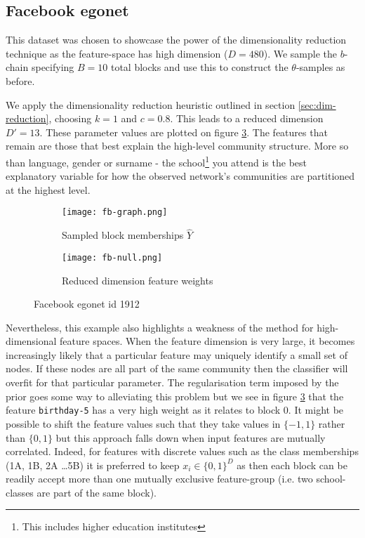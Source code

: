 \subsection{Facebook egonet}

This dataset was chosen to showcase the power of the dimensionality reduction technique as the feature-space has high dimension ($D=480$). We sample the $b$-chain specifying $B=10$ total blocks and use this to construct the $\theta$-samples as before. 

We apply the dimensionality reduction heuristic outlined in section \ref{sec:dim-reduction}, choosing $k=1$ and $c=0.8$. This leads to a reduced dimension $D'=13$. These parameter values are plotted on figure \ref{fig:fb-null}. The features that remain are those that best explain the high-level community structure. More so than language, gender or surname - the school\footnote{This includes higher education institutes} you attend is the best explanatory variable for how the observed network's communities are partitioned at the highest level. 
%
\begin{figure}[!h]
	\centering
	\begin{subfigure}{0.45\linewidth}
		\centering
		\texttt{[image: fb-graph.png]}
		\caption{Sampled block memberships $\hat{Y}$}
		\label{fig:fb-graph}
	\end{subfigure}
	\hfill
	\begin{subfigure}{0.45\linewidth}
		\centering
		\texttt{[image: fb-null.png]}
		\caption{Reduced dimension feature weights}
		\label{fig:fb-null}
	\end{subfigure}
	\caption{Facebook egonet id 1912 \cite{fb-snap}}
\end{figure}

Nevertheless, this example also highlights a weakness of the method for high-dimensional feature spaces. When the feature dimension is very large, it becomes increasingly likely that a particular feature may uniquely identify a small set of nodes. If these nodes are all part of the same community then the classifier will overfit for that particular parameter. The regularisation term imposed by the prior goes some way to alleviating this problem but we see in figure \ref{fig:fb-null} that the feature \verb*|birthday-5| has a very high weight as it relates to block 0. It might be possible to shift the feature values such that they take values in $\{-1, 1\}$ rather than $\{0, 1\}$ but this approach falls down when input features are mutually correlated. Indeed, for features with discrete values such as the class memberships (1A, 1B, 2A \dots 5B) it is preferred to keep $x_i \in \{0, 1\}^D$ as then each block can be readily accept more than one mutually exclusive feature-group (i.e. two school-classes are part of the same block).

